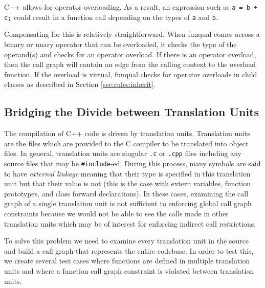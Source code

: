 C++ allows for operator overloading.  As a result, an expression such as \mbox{\lstinline{a = b + c;}} could result in a function call depending on the types of \lstinline{a} and \lstinline{b}.  

Compensating for this is relatively straightforward.  When funqual comes across a binary or unary operator that can be overloaded, it checks the type of the operand(s) and checks for an operator overload.  If there is an operator overload, then the call graph will contain an edge from the calling context to the overload function.  If the overload is virtual, funqual checks for operator overloads in child classes as described in Section \ref{sec:rules:inherit}.

\subsection{Bridging the Divide between Translation Units}

The compilation of C++ code is driven by translation units.  Translation units are the files which are provided to the C compiler to be translated into object files.  In general, translation units are singular \lstinline{.c} or \lstinline{.cpp} files including any source files that may be \lstinline{#include}-ed.  During this process, many symbols are said to have \textit{external linkage} meaning that their type is specified in this translation unit but that their value is not (this is the case with extern variables, function prototypes, and class forward declarations).  In these cases, examining the call graph of a single translation unit is not sufficient to enforcing global call graph constraints because we would not be able to see the calls made in other translation units which may be of interest for enforcing indirect call restrictions.  

To solve this problem we need to examine every translation unit in the source and build a call graph that represents the entire codebase.  In order to test this, we create several test cases where functions are defined in multiple translation units and where a function call graph constraint is violated between translation units.
